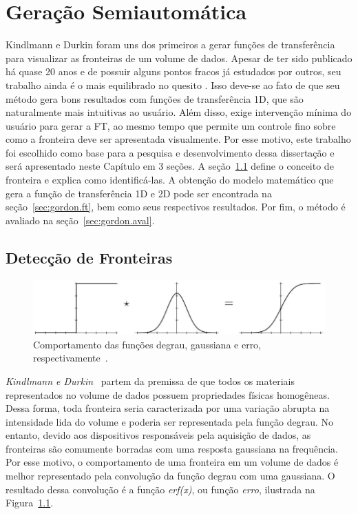 
\chapter{Geração Semiautomática}
\label{ch:gordon}

	Kindlmann e Durkin foram uns dos primeiros a gerar funções de transferência para visualizar as fronteiras de um volume de dados. Apesar de ter sido publicado há quase 20 anos e de possuir alguns pontos fracos já estudados por outros, seu trabalho ainda é o mais equilibrado no quesito . Isso deve-se ao fato de que seu método gera bons resultados com funções de transferência 1D, que são naturalmente mais intuitivas ao usuário. Além disso, exige intervenção mínima do usuário para gerar a FT, ao mesmo tempo que permite um controle fino sobre como a fronteira deve ser apresentada visualmente. Por esse motivo, este trabalho foi escolhido como base para a pesquisa e desenvolvimento dessa dissertação e será apresentado neste Capítulo em 3 seções. A seção~\ref{sec:gordon.bound} define o conceito de fronteira e explica como identificá-las. A obtenção do modelo matemático que gera a função de transferência 1D e 2D pode ser encontrada na seção~\ref{sec:gordon.ft}, bem como seus respectivos resultados. Por fim, o método é avaliado na seção~\ref{sec:gordon.aval}.
	
\section{Detecção de Fronteiras}
\label{sec:gordon.bound}

\begin{figure}[b]
	\centering
	\includegraphics[width=1\textwidth]{images/g_boundary_model}
	\caption{Comportamento das funções degrau, gaussiana e erro, respectivamente~\cite{gordon}.}
	\label{fig:boundary_model}
\end{figure}

	\textit{Kindlmann e Durkin}~\cite{gordon} partem da premissa de que todos os materiais representados no volume de dados possuem propriedades físicas homogêneas. Dessa forma, toda fronteira seria caracterizada por uma variação abrupta na intensidade lida do volume e poderia ser representada pela função degrau. No entanto, devido aos dispositivos responsáveis pela aquisição de dados, as fronteiras são comumente borradas com uma resposta gaussiana na frequência. Por esse motivo, o comportamento de uma fronteira em um volume de dados é melhor representado pela convolução da função degrau com uma gaussiana. O resultado dessa convolução é a função \textit{erf(x)}, ou função \textit{erro}, ilustrada na Figura~\ref{fig:boundary_model}.

